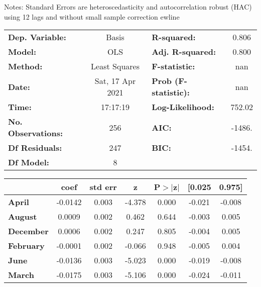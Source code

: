 Notes: \newline
 [1] Standard Errors are heteroscedasticity and autocorrelation robust (HAC) using 12 lags and without small sample correction
ewline\begin{center}
\begin{tabular}{lclc}
\toprule
\textbf{Dep. Variable:}    &      Basis       & \textbf{  R-squared:         } &     0.806   \\
\textbf{Model:}            &       OLS        & \textbf{  Adj. R-squared:    } &     0.800   \\
\textbf{Method:}           &  Least Squares   & \textbf{  F-statistic:       } &       nan   \\
\textbf{Date:}             & Sat, 17 Apr 2021 & \textbf{  Prob (F-statistic):} &      nan    \\
\textbf{Time:}             &     17:17:19     & \textbf{  Log-Likelihood:    } &    752.02   \\
\textbf{No. Observations:} &         256      & \textbf{  AIC:               } &    -1486.   \\
\textbf{Df Residuals:}     &         247      & \textbf{  BIC:               } &    -1454.   \\
\textbf{Df Model:}         &           8      & \textbf{                     } &             \\
\bottomrule
\end{tabular}
\begin{tabular}{lcccccc}
                  & \textbf{coef} & \textbf{std err} & \textbf{z} & \textbf{P$> |$z$|$} & \textbf{[0.025} & \textbf{0.975]}  \\
\midrule
\textbf{April}    &      -0.0142  &        0.003     &    -4.378  &         0.000        &       -0.021    &       -0.008     \\
\textbf{August}   &       0.0009  &        0.002     &     0.462  &         0.644        &       -0.003    &        0.005     \\
\textbf{December} &       0.0006  &        0.002     &     0.247  &         0.805        &       -0.004    &        0.005     \\
\textbf{February} &      -0.0001  &        0.002     &    -0.066  &         0.948        &       -0.005    &        0.004     \\
\textbf{June}     &      -0.0136  &        0.003     &    -5.023  &         0.000        &       -0.019    &       -0.008     \\
\textbf{March}    &      -0.0175  &        0.003     &    -5.106  &         0.000        &       -0.024    &       -0.011     \\

\end{tabular}
\end{center}

